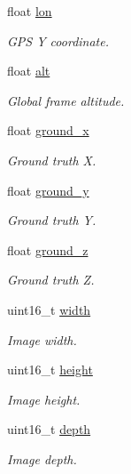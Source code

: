 \begin{DoxyCompactItemize}
float \hyperlink{struct____mavlink__image__available__t_a50de3c4b3b923b79096e95cf1b02855d}{lon}
\begin{DoxyCompactList}\small\item\em G\+P\+S Y coordinate. \end{DoxyCompactList}\item 
float \hyperlink{struct____mavlink__image__available__t_a02d7a1fd93825b80d12c4a6188f8a486}{alt}
\begin{DoxyCompactList}\small\item\em Global frame altitude. \end{DoxyCompactList}\item 
float \hyperlink{struct____mavlink__image__available__t_acca01133ac2d009cdde67460cd6c3a80}{ground\+\_\+x}
\begin{DoxyCompactList}\small\item\em Ground truth X. \end{DoxyCompactList}\item 
float \hyperlink{struct____mavlink__image__available__t_a7af72af41728ab05afbfdce680b2897d}{ground\+\_\+y}
\begin{DoxyCompactList}\small\item\em Ground truth Y. \end{DoxyCompactList}\item 
float \hyperlink{struct____mavlink__image__available__t_a1841e4a3c1e6cdbcdd768040e336b790}{ground\+\_\+z}
\begin{DoxyCompactList}\small\item\em Ground truth Z. \end{DoxyCompactList}\item 
uint16\+\_\+t \hyperlink{struct____mavlink__image__available__t_a577f2cf7105af75a14301b7d238f6a4e}{width}
\begin{DoxyCompactList}\small\item\em Image width. \end{DoxyCompactList}\item 
uint16\+\_\+t \hyperlink{struct____mavlink__image__available__t_a09e859dfd3fa5fc9a08e9d4e042cbd85}{height}
\begin{DoxyCompactList}\small\item\em Image height. \end{DoxyCompactList}\item 
uint16\+\_\+t \hyperlink{struct____mavlink__image__available__t_ac4201b17a19aa7835c7e0bdf0f78a128}{depth}
\begin{DoxyCompactList}\small\item\em Image depth. \end{DoxyCompactList}\item 

\end{DoxyCompactItemize}
